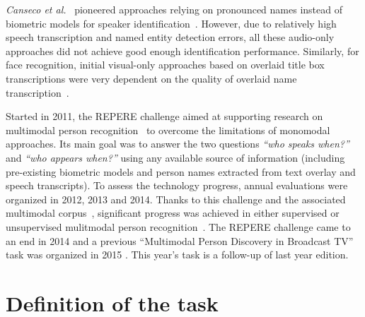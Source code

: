 \documentclass{acm_proc_article-me}
\begin{document}
\textit{Canseco et al.}~\cite{CANSECO--ASRU--2005, CANSECO--INTERSPEECH--2004} pioneered approaches relying on pronounced names instead of biometric models for speaker identification~\cite{ESTEVE--INTERSPEECH--2007, JOUSSE--ICCASP--2009, MAUCLAIR--Odyssey--2006, TRANTER--ICASSP--2006}. However, due to relatively high speech transcription and named entity detection errors, all these audio-only approaches did not achieve good enough identification performance. Similarly, for face recognition, initial visual-only approaches based on overlaid title box transcriptions were very dependent on the quality of overlaid name transcription~\cite{HOUGHTON--IS--1999, SATOH--IEEEMM--1999, YANG--ACMMM--2004, YANG--ACMMM--2005}.

Started in 2011, the REPERE challenge aimed at supporting research on multimodal person recognition~\cite{BERNARD--SLAM--2013, KAHN--CBMI--2012} to overcome the limitations of monomodal approaches. Its main goal was to answer the two questions \emph{``who speaks when?''} and \emph{``who appears when?''} using any available source of information (including pre-existing biometric models and person names extracted from text overlay and speech transcripts). To assess the technology progress, annual evaluations were organized in 2012, 2013 and 2014. Thanks to this challenge and the associated multimodal corpus~\cite{GIRAUDEL--LREC--2012}, significant progress was achieved in either supervised or unsupervised mulitmodal person recognition~\cite{BECHET--INTERSPEECH--2014, BENDRIS--CBMI--2013, BREDIN--ODYSSEY--2014, BREDIN--INTERSPEECH--2013, BREDIN--SLAM--2013, BREDIN--IJMIR--2014, FAVRE--SLAM--2013, GAY--CBMI--2014, POIGNANT--ASLP--2015, POIGNANT--SLAM--2013, POIGNANT--INTERSPEECH--2012, POIGNANT--MTAP--2015, ROUVIER--CBMI--2014}.
The REPERE challenge came to an end in 2014 and a previous ``Multimodal Person Discovery in Broadcast TV'' task was organized in 2015 \cite{POIGNANT--MEDIAEVAL--2015}. This year's task is a follow-up of last year edition.

\vspace{-0.1cm}
\section{Definition of the task}
\end{document}
